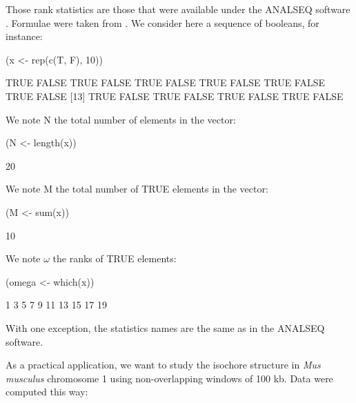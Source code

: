 \documentclass{article}
\begin{document}
Those rank statistics are those that were available under the ANALSEQ
software \cite{analseq, acnuc1984}. Formulae were taken from \cite{ChasseJL1988}.
We consider here a sequence
of booleans, for instance:

\begin{Schunk}
\begin{Sinput}
 (x <- rep(c(T, F), 10))
\end{Sinput}
\begin{Soutput}
 [1]  TRUE FALSE  TRUE FALSE  TRUE FALSE  TRUE FALSE  TRUE FALSE  TRUE FALSE
[13]  TRUE FALSE  TRUE FALSE  TRUE FALSE  TRUE FALSE
\end{Soutput}
\end{Schunk}

We note $\mathrm{N}$ the total number of elements in the vector:

\begin{Schunk}
\begin{Sinput}
 (N <- length(x))
\end{Sinput}
\begin{Soutput}
[1] 20
\end{Soutput}
\end{Schunk}

We note $\mathrm{M}$ the total number of TRUE elements in the vector:

\begin{Schunk}
\begin{Sinput}
 (M <- sum(x))
\end{Sinput}
\begin{Soutput}
[1] 10
\end{Soutput}
\end{Schunk}

We note $\omega$ the ranks of TRUE elements:

\begin{Schunk}
\begin{Sinput}
 (omega <- which(x))
\end{Sinput}
\begin{Soutput}
 [1]  1  3  5  7  9 11 13 15 17 19
\end{Soutput}
\end{Schunk}

With one exception, the statistics names are the same as in the ANALSEQ software.

As a practical application, we want to study the isochore structure in \textit{Mus
musculus} chromosome 1 using non-overlapping windows of 100 kb. Data were 
computed this way:
\end{document}
